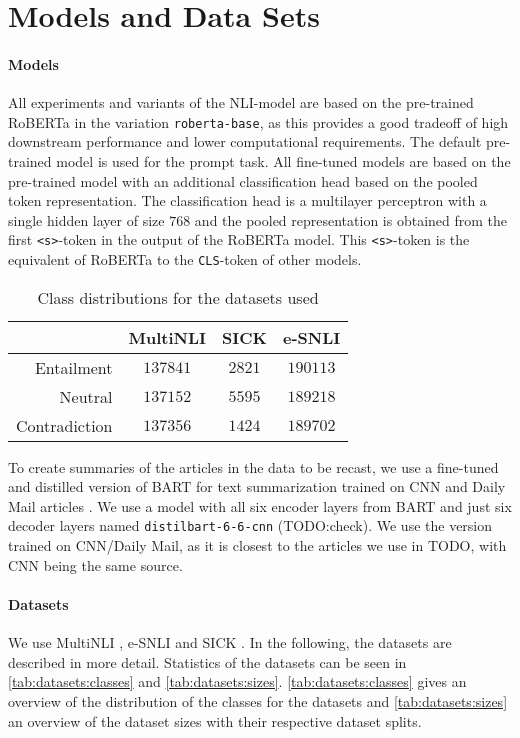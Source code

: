 \section{Models and Data Sets} \label{sec:models_datasets}
\paragraph{Models}
All experiments and variants of the \acs{NLI}-model are based on the pre-trained \acf{RoBERTa} \cite{roberta} in the variation \texttt{roberta-base}, as this provides a good tradeoff of high downstream performance and lower computational requirements. The default pre-trained model is used for the prompt task. All fine-tuned models are based on the pre-trained model with an additional classification head based on the pooled token representation. The classification head is a multilayer perceptron with a single hidden layer of size $768$ and the pooled representation is obtained from the first \texttt{<s>}-token in the output of the \acs{RoBERTa} model. This \texttt{<s>}-token is the equivalent of \acs{RoBERTa} to the \texttt{CLS}-token of other models.

\begin{table}[ht]
    \centering
    \caption{Class distributions for the datasets used}
    \begin{tabular}{r || c | c | c}
        & \acs{MultiNLI} & \acs{SICK} & \acs{e-SNLI} \\
        \hline
        Entailment & $137841$ & $2821$ & $190113$ \\
        Neutral & $137152$ & $5595$ & $189218$ \\
        Contradiction & $137356$ & $1424$ & $189702$
    \end{tabular}
    \label{tab:datasets:classes}
\end{table}

To create summaries of the articles in the data to be recast, we use a fine-tuned and distilled version of BART \cite{lewis-etal-2020-bart} for text summarization trained on CNN and Daily Mail articles \cite{cnn1,cnn2}. \cite{shleifer2020pretrained} We use a model with all six encoder layers from BART and just six decoder layers named \texttt{distilbart-6-6-cnn} (TODO:check). We use the version trained on CNN/Daily Mail, as it is closest to the articles we use in TODO, with CNN being the same source.

\paragraph{Datasets} \label{par:models_datasets:datasets}
We use \acs{MultiNLI} \cite{multinli}, \acs{e-SNLI} \cite{esnli} and \acs{SICK} \cite{sick}. In the following, the datasets are described in more detail. Statistics of the datasets can be seen in \autoref{tab:datasets:classes} and \autoref{tab:datasets:sizes}. \autoref{tab:datasets:classes} gives an overview of the distribution of the classes for the datasets and \autoref{tab:datasets:sizes} an overview of the dataset sizes with their respective dataset splits.

